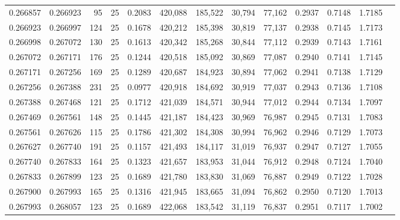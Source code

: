 \begin{tabular}{rrrrrrrrrrrrr}
0.266857 & 0.266923 &    95 &  25 &                                     0.2083 & 420,088 & 185,522 &  30,794 &  77,162 & 0.2937 & 0.7148 & 1.7185 \\
0.266923 & 0.266997 &   124 &  25 &                                     0.1678 & 420,212 & 185,398 &  30,819 &  77,137 & 0.2938 & 0.7145 & 1.7173 \\
0.266998 & 0.267072 &   130 &  25 &                                     0.1613 & 420,342 & 185,268 &  30,844 &  77,112 & 0.2939 & 0.7143 & 1.7161 \\
0.267072 & 0.267171 &   176 &  25 &                                     0.1244 & 420,518 & 185,092 &  30,869 &  77,087 & 0.2940 & 0.7141 & 1.7145 \\
0.267171 & 0.267256 &   169 &  25 &                                     0.1289 & 420,687 & 184,923 &  30,894 &  77,062 & 0.2941 & 0.7138 & 1.7129 \\
0.267256 & 0.267388 &   231 &  25 &                                     0.0977 & 420,918 & 184,692 &  30,919 &  77,037 & 0.2943 & 0.7136 & 1.7108 \\
0.267388 & 0.267468 &   121 &  25 &                                     0.1712 & 421,039 & 184,571 &  30,944 &  77,012 & 0.2944 & 0.7134 & 1.7097 \\
0.267469 & 0.267561 &   148 &  25 &                                     0.1445 & 421,187 & 184,423 &  30,969 &  76,987 & 0.2945 & 0.7131 & 1.7083 \\
0.267561 & 0.267626 &   115 &  25 &                                     0.1786 & 421,302 & 184,308 &  30,994 &  76,962 & 0.2946 & 0.7129 & 1.7073 \\
0.267627 & 0.267740 &   191 &  25 &                                     0.1157 & 421,493 & 184,117 &  31,019 &  76,937 & 0.2947 & 0.7127 & 1.7055 \\
0.267740 & 0.267833 &   164 &  25 &                                     0.1323 & 421,657 & 183,953 &  31,044 &  76,912 & 0.2948 & 0.7124 & 1.7040 \\
0.267833 & 0.267899 &   123 &  25 &                                     0.1689 & 421,780 & 183,830 &  31,069 &  76,887 & 0.2949 & 0.7122 & 1.7028 \\
0.267900 & 0.267993 &   165 &  25 &                                     0.1316 & 421,945 & 183,665 &  31,094 &  76,862 & 0.2950 & 0.7120 & 1.7013 \\
0.267993 & 0.268057 &   123 &  25 &                                     0.1689 & 422,068 & 183,542 &  31,119 &  76,837 & 0.2951 & 0.7117 & 1.7002 \\

\end{tabular}
